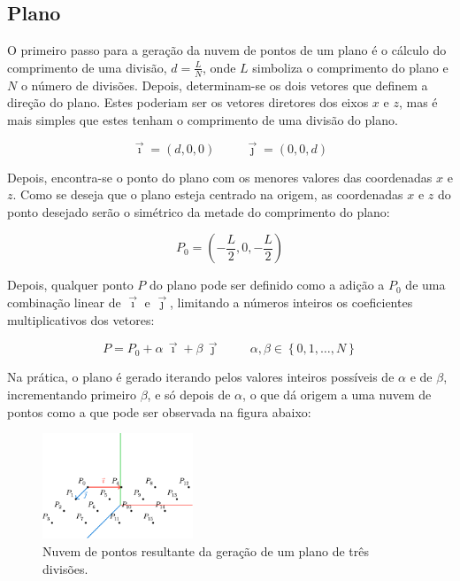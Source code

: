 \documentclass[12pt, a4paper]{article}
\begin{document}
\subsection{Plano}

O primeiro passo para a geração da nuvem de pontos de um plano é o cálculo do comprimento de uma
divisão, $d = \frac{L}{N}$, onde $L$ simboliza o comprimento do plano e $N$ o número de divisões.
Depois, determinam-se os dois vetores que definem a direção do plano. Estes poderiam ser os vetores
diretores dos eixos $x$ e $z$, mas é mais simples que estes tenham o comprimento de uma divisão do
plano.

$$
\vec{\imath} = (d, 0, 0)
\hspace{1cm}
\vec{\jmath} = (0, 0, d)
$$

Depois, encontra-se o ponto do plano com os menores valores das coordenadas $x$ e $z$. Como se
deseja que o plano esteja centrado na origem, as coordenadas $x$ e $z$ do ponto desejado serão o
simétrico da metade do comprimento do plano:

$$
P_0 = \left ( - \frac{L}{2}, 0, - \frac{L}{2} \right )
$$

Depois, qualquer ponto $P$ do plano pode ser definido como a adição a $P_0$ de uma combinação linear
de $\vec{\imath}$ e $\vec{\jmath}$, limitando a números inteiros os coeficientes multiplicativos dos
vetores:

$$
P = P_0 + \alpha \, \vec{\imath} + \beta \, \vec{\jmath}
\hspace{1cm}
\alpha, \beta \in \left \lbrace 0, 1, \ldots, N \right \rbrace
$$

Na prática, o plano é gerado iterando pelos valores inteiros possíveis de $\alpha$ e de $\beta$,
incrementando primeiro $\beta$, e só depois de $\alpha$, o que dá origem a uma nuvem de pontos como
a que pode ser observada na figura abaixo:

\begin{figure}[H]
    \centering
    \includegraphics[width=0.4\textwidth]{res/figures/PlanePoints.pdf}
    \caption{Nuvem de pontos resultante da geração de um plano de três divisões.}
\end{figure}
\end{document}
